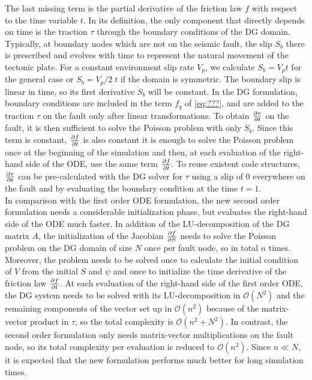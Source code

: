 The last missing term is the partial derivative of the friction law $f$ with respect to the time variable $t$. In its definition, the only component that directly depends on time is the traction $\tau$ through the boundary conditions of the DG domain. Typically, at boundary nodes which are not on the seismic fault, the slip $S_b$ there is prescribed and evolves with time to represent the natural movement of the tectonic plate. For a constant environment slip rate $V_p$, we calculate $S_b=V_pt$ for the general case or $S_b=V_p/2\;t$ if the domain is symmetric. The boundary slip is linear in time, so its first derivative $\dot{S}_b$ will be constant. In the DG formulation, boundary conditions are included in the term $f_q$ of \autoref{eq:???}, and are added to the traction $\tau$ on the fault only after linear transformations. To obtain $\pdv{\tau}{t}$ on the fault, it is then sufficient to solve the Poisson problem with only $\dot{S}_b$. Since this term is constant, $\pdv{f}{t}$ is also constant it is enough to solve the Poisson problem once at the beginning of the simulation and then, at each evaluation of the right-hand side of the ODE, use the same term $\pdv{f}{t}$. To reuse existent code structures, $\pdv{\tau}{t}$ can be pre-calculated with the DG solver for $\tau$ using a slip of 0 everywhere on the fault and by evaluating the boundary condition at the time $t=1$. \\
In comparison with the first order ODE formulation, the new second order formulation needs a considerable initialization phase, but evaluates the right-hand side of the ODE much faster. In addition of the LU-decomposition of the DG matrix $A$, the initialization of the Jacobian $\pdv{f}{S}$ needs to solve the Poisson problem on the DG domain of size $N$ once per fault node, so in total $n$ times. Moreover, the problem needs to be solved once to calculate the initial condition of $V$ from the initial $S$ and $\psi$ and once to initialize the time derivative of the friction law $\pdv{f}{t}$. At each evaluation of the right-hand side of the first order ODE, the DG system needs to be solved with its LU-decomposition in $\mathcal{O}\left(N^2\right)$ and the remaining components of the vector set up in $\mathcal{O}\left(n^2\right)$ because of the matrix-vector product in $\tau$, so the total complexity is $\mathcal{O}\left(n^2+N^2\right)$. In contrast, the second order formulation only needs matrix-vector multiplications on the fault node, so its total complexity per evaluation is reduced to $\mathcal{O}\left(n^2\right)$. Since $n\ll N$, it is expected that the new formulation performs much better for long simulation times. \\
